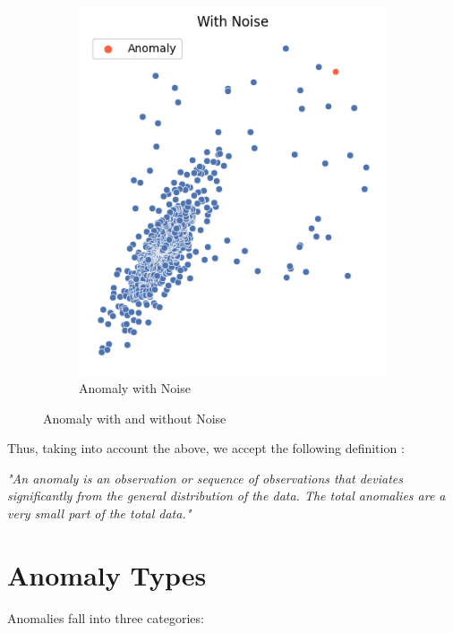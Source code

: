 \documentclass[a4paper,12pt]{report}
\theoremstyle{definitionNODot}
\begin{document}
\begin{figure}[h]
\begin{subfigure}[b]{0.49\textwidth}
			\includegraphics[width=\textwidth]{anomaly_vs_noise_no_clear_outlier.png}
			\caption{Anomaly with Noise}
			\label{fig:anomaly with noise}
		\end{subfigure}
		\caption{Anomaly with and without Noise}
		\label{fig:anomaly vs anomaly with noise}
	\end{figure}
	\noindent Thus, taking into account the above, we accept the following definition \cite{braei2020anomaly}:
	
	\begin{center}
		\textit{"An anomaly is an observation or sequence of observations that deviates significantly from the general distribution of the data. The total anomalies are a very small part of the total data."}
	\end{center}
	\hfill
	
	\section{Anomaly Types}
	
	Anomalies fall into three categories:
	
\end{document}
